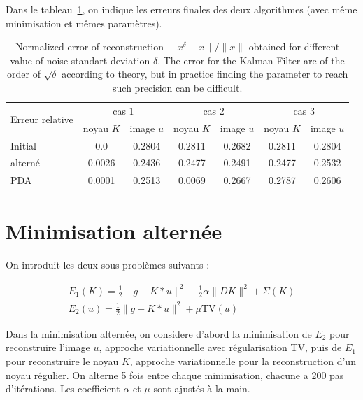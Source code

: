 \documentclass[a4paper]{article}
\begin{document}
Dans le tableau~\ref{tab:compare}, on indique les erreurs finales des deux algorithmes 
(avec même minimisation et mêmes paramètres).
\begin{table}[h]
    \centering
    \begin{tabular}{lcccccc}
    \multirow{2}{*}{Erreur relative}
    &\multicolumn{2}{c}{cas 1}
    &\multicolumn{2}{c}{cas 2}
    &\multicolumn{2}{c}{cas 3}\\
    \cline{2-3}
    \cline{4-5}
    \cline{6-7}
    &noyau $K$& image $u$
    &noyau $K$& image $u$
   &noyau $K$& image $u$
    \\
    \hline
   Initial  &   0.0 & 0.2804
              &  0.2811  & 0.2682
              & 0.2811  & 0.2804
    \\
    alterné  & 0.0026 & 0.2436
                 &0.2477   & 0.2491
                 & 0.2477 &0.2532
    \\
    PDA  &0.0001    & 0.2513
               & 0.0069  & 0.2667
               & 0.2787   &0.2606 
    \end{tabular}
    \caption{Normalized error of reconstruction $\| x^\delta -x \| /\|x\|$ obtained for different value of noise standart deviation $\delta$.
    The error for the Kalman Filter are of the order of $\sqrt{\delta} $ according to theory, but in practice finding the parameter to reach such precision can be difficult.}
    \label{tab:compare}
\end{table}

\section{Minimisation alternée}

On introduit les deux sous problèmes suivants :

\begin{align}
E_1(K) = \frac{1}{2} \| g - K * u\|^2 + \frac{1}{2} \alpha \| D K \|^2 + \Sigma(K) \\
E_2(u) = \frac{1}{2} \| g - K * u\|^2 +  \mu \text{TV} (u)
\end{align}

Dans la minimisation alternée, on considere d'abord la minimisation de $E_2$ 
pour reconstruire l'image $u$, approche variationnelle avec régularisation TV,
 puis de $E_1$ pour reconstruire le noyau $K$, approche variationnelle pour la reconstruction d'un noyau régulier.
On alterne 5 fois entre chaque minimisation, chacune a 200 pas d'itérations.
Les coefficient $\alpha$ et $\mu$ sont ajustés à la main.
\end{document}
